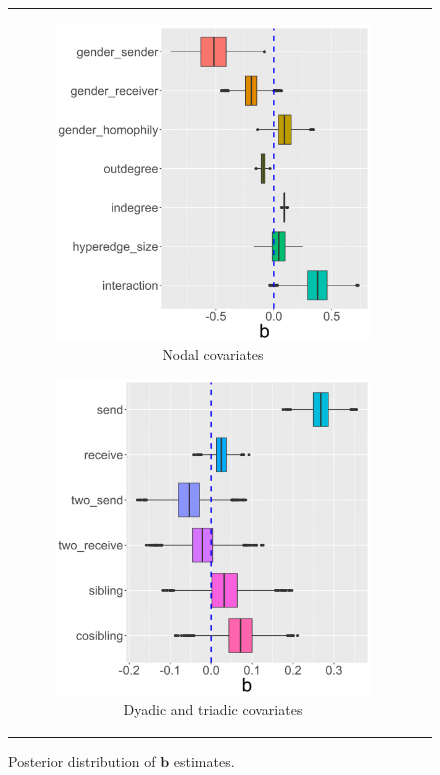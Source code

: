 \documentclass[ba]{imsart}
\numberwithin{equation}{section}
\theoremstyle{plain}
\begin{document}
			\begin{figure}[!t]
				\centering
				\begin{tabular}[t]{cc}
					\begin{subfigure}[b]{0.495\textwidth}
						\caption{Nodal covariates}
						\includegraphics[width=\textwidth]{img/betanewplot2-1.png}	
					\end{subfigure}
					\begin{subfigure}[b]{0.495\textwidth}
						\caption{Dyadic and triadic covariates}
						\includegraphics[width=\textwidth]{img/betanewplot3-1.png}	
					\end{subfigure}
				\end{tabular}
				\caption {Posterior distribution of $\boldsymbol{b}$ estimates.}
				\label{figure:betaresults}
			\end{figure}
\end{document}
